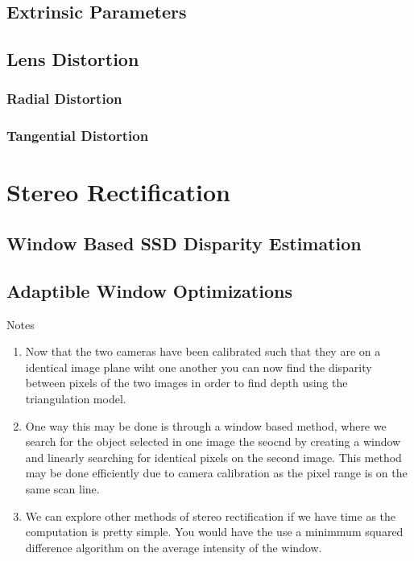 \documentclass[11pt]{scrartcl}
\begin{document}
\begin{remark}
\subsection{Extrinsic Parameters}

\subsection{Lens Distortion}

    \subsubsection{Radial Distortion}
    \subsubsection{Tangential Distortion}

    
\end{remark}

\section{Stereo Rectification}

\subsection{Window Based SSD Disparity Estimation}
\subsection{Adaptible Window Optimizations}
\begin{remark}
    Notes{\begin{enumerate}
        \item Now that the two cameras have been calibrated such that they are on a identical image plane wiht one another you can now find the disparity between pixels of the two images in order to find depth using the triangulation model. 
        \item One way this may be done is through a window based method, where we search for the object selected in one image the seocnd by creating a window and linearly searching for identical pixels on the second image. This method may be done efficiently due to camera calibration as the pixel range is on the same scan line. 
        \item We can explore other methods of stereo rectification if we have time as the computation is pretty simple. You would have the use
            a minimmum squared difference algorithm on the average intensity of the window. 
    \end{enumerate}} %
    \label{par:Notes}

    
\end{remark}
\end{document}
